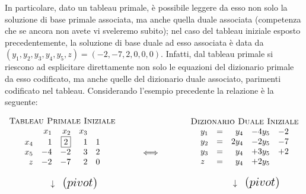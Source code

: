 \documentclass{article}
\begin{document}
  	In particolare, dato un tableau primale, è possibile leggere da esso non solo la soluzione di base primale associata, ma anche quella duale associata (competenza che se ancora non avete vi sveleremo subito); nel caso del tableau iniziale esposto precedentemente, la soluzione di base duale ad esso associata è data da $(y_1,y_2,y_3,y_4,y_5,z)=(-2,-7,2,0,0,0)$. Infatti, dal tableau primale si riescono ad esplicitare direttamente non solo le equazioni del dizionario primale da esso codificato, ma anche quelle del dizionario duale associato, parimenti codificato nel tableau. Considerando l'esempio precedente la relazione \`e la seguente:
  	
  	\[
  	\begin{array}{c}
  	\mbox{\sc Tableau Primale Iniziale}\\
	\begin{array}{rrrrr}
	& x_1  & x_2 & x_3  \\
	x_4 &  1 &  \fbox{2} &  1   &  1 \\
	x_5 & -4 & -2 & 3 &  2 \\
	z  & -2 & -7 &  2   &  0 \\
  	\end{array}\\ \\
  	\hspace{1cm} {\Huge \downarrow} {\Large \mbox{ \ $(pivot)$}}
  	\end{array}
  	\hfill
  	\hspace{1cm}
  	{\Huge \Longleftrightarrow}
  	\hfill
  	\hspace{1.2cm}
  	\begin{array}{c}
  	\mbox{\sc Dizionario Duale Iniziale}\\
  	\begin{array}{lcrrr}
  	y_{1} &=& y_4 & -4y_5 & -2 \\
  	y_{2} &=& 2y_4 & -2y_5 & -7 \\
  	y_{3} &=& y_4 & +3y_5 & +2 \\
  	z &=& y_4 & +2y_5 &  \\
   	\end{array}	\\	\\
  	\hspace{1cm} {\Huge \downarrow} {\Large \mbox{ \ $(pivot)$}}
  	\end{array}
  	\]
  	
\end{document}
